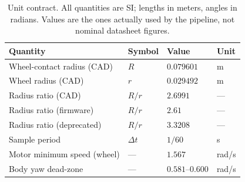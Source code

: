 \begin{table}[t]
  \caption{Unit contract. All quantities are SI; lengths in meters, angles in
  radians. Values are the ones actually used by the pipeline, not nominal
  datasheet figures.}
  \label{tab:units}
  \centering
  \begin{tabular}{llll}
    \toprule
    Quantity & Symbol & Value & Unit \\
    \midrule
    Wheel-contact radius (CAD)   & $R$          & $0.079601$        & \si{m} \\
    Wheel radius (CAD)           & $r$          & $0.029492$        & \si{m} \\
    Radius ratio (CAD)           & $R/r$        & $2.6991$          & --- \\
    Radius ratio (firmware)      & $R/r$        & $2.61$            & --- \\
    Radius ratio (deprecated)    & $R/r$        & $3.3208$          & --- \\
    Sample period                & $\Delta t$   & $1/60$            & \si{s} \\
    Motor minimum speed (wheel)  & ---          & $1.567$           & \si{rad/s} \\
    Body yaw dead-zone           & ---          & $0.581$--$0.600$  & \si{rad/s} \\
    \bottomrule
  \end{tabular}
\end{table}
